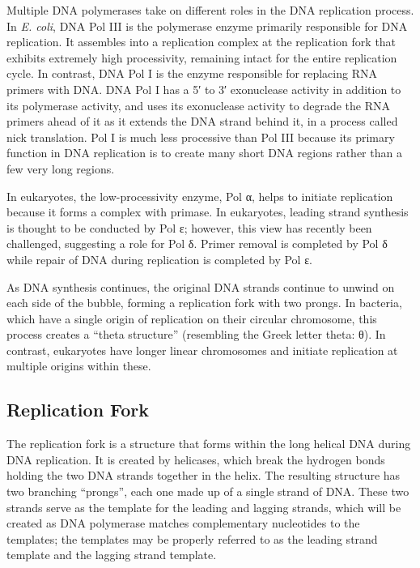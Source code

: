 Multiple DNA polymerases take on different roles in the DNA replication process. In \emph{E. coli}, DNA Pol III is the polymerase enzyme primarily responsible for DNA replication. It assembles into a replication complex at the replication fork that exhibits extremely high processivity, remaining intact for the entire replication cycle. In contrast, DNA Pol I is the enzyme responsible for replacing RNA primers with DNA. DNA Pol I has a 5′ to 3′ exonuclease activity in addition to its polymerase activity, and uses its exonuclease activity to degrade the RNA primers ahead of it as it extends the DNA strand behind it, in a process called nick translation. Pol I is much less processive than Pol III because its primary function in DNA replication is to create many short DNA regions rather than a few very long regions.

In eukaryotes, the low-processivity enzyme, Pol α, helps to initiate replication because it forms a complex with primase. In eukaryotes, leading strand synthesis is thought to be conducted by Pol ε; however, this view has recently been challenged, suggesting a role for Pol δ. Primer removal is completed by Pol δ while repair of DNA during replication is completed by Pol ε.

As DNA synthesis continues, the original DNA strands continue to unwind on each side of the bubble, forming a replication fork with two prongs. In bacteria, which have a single origin of replication on their circular chromosome, this process creates a ``theta structure'' (resembling the Greek letter theta: θ). In contrast, eukaryotes have longer linear chromosomes and initiate replication at multiple origins within these.

\hypertarget{replication-fork}{%
\subsection{Replication Fork}\label{replication-fork}}

The replication fork is a structure that forms within the long helical DNA during DNA replication. It is created by helicases, which break the hydrogen bonds holding the two DNA strands together in the helix. The resulting structure has two branching ``prongs'', each one made up of a single strand of DNA. These two strands serve as the template for the leading and lagging strands, which will be created as DNA polymerase matches complementary nucleotides to the templates; the templates may be properly referred to as the leading strand template and the lagging strand template.

